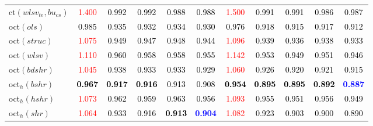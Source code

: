 \begin{tabular}[t]{l|>{}cccc>{}c|ccccc}
ct$(wlsv_{te}, bu_{cs})$ & \textcolor{red}{1.400} & \textcolor{black}{0.992} & \textcolor{black}{0.992} & \textcolor{black}{0.988} & \textcolor{black}{0.988} & \textcolor{red}{1.500} & \textcolor{black}{0.991} & \textcolor{black}{0.991} & \textcolor{black}{0.986} & \textcolor{black}{0.987}\\
oct$(ols)$ & \textcolor{black}{0.985} & \textcolor{black}{0.935} & \textcolor{black}{0.932} & \textcolor{black}{0.934} & \textcolor{black}{0.930} & \textcolor{black}{0.976} & \textcolor{black}{0.918} & \textcolor{black}{0.915} & \textcolor{black}{0.917} & \textcolor{black}{0.912}\\
oct$(struc)$ & \textcolor{red}{1.075} & \textcolor{black}{0.949} & \textcolor{black}{0.947} & \textcolor{black}{0.948} & \textcolor{black}{0.944} & \textcolor{red}{1.096} & \textcolor{black}{0.939} & \textcolor{black}{0.936} & \textcolor{black}{0.938} & \textcolor{black}{0.933}\\
oct$(wlsv)$ & \textcolor{red}{1.110} & \textcolor{black}{0.960} & \textcolor{black}{0.958} & \textcolor{black}{0.958} & \textcolor{black}{0.955} & \textcolor{red}{1.142} & \textcolor{black}{0.953} & \textcolor{black}{0.949} & \textcolor{black}{0.951} & \textcolor{black}{0.946}\\
oct$(bdshr)$ & \textcolor{red}{1.045} & \textcolor{black}{0.938} & \textcolor{black}{0.933} & \textcolor{black}{0.933} & \textcolor{black}{0.929} & \textcolor{red}{1.060} & \textcolor{black}{0.926} & \textcolor{black}{0.920} & \textcolor{black}{0.921} & \textcolor{black}{0.915}\\
oct$_h(bshr)$ & \textcolor{black}{\textbf{0.967}} & \textcolor{black}{\textbf{0.917}} & \textcolor{black}{\textbf{0.916}} & \textcolor{black}{0.913} & \textcolor{black}{0.908} & \textcolor{black}{\textbf{0.954}} & \textcolor{black}{\textbf{0.895}} & \textcolor{black}{\textbf{0.895}} & \textcolor{black}{\textbf{0.892}} & \textcolor{blue}{\textbf{0.887}}\\
oct$_h(hshr)$ & \textcolor{red}{1.073} & \textcolor{black}{0.962} & \textcolor{black}{0.959} & \textcolor{black}{0.963} & \textcolor{black}{0.956} & \textcolor{red}{1.093} & \textcolor{black}{0.955} & \textcolor{black}{0.951} & \textcolor{black}{0.956} & \textcolor{black}{0.949}\\
oct$_h(shr)$ & \textcolor{red}{1.064} & \textcolor{black}{0.933} & \textcolor{black}{0.916} & \textcolor{black}{\textbf{0.913}} & \textcolor{blue}{\textbf{0.904}} & \textcolor{red}{1.082} & \textcolor{black}{0.923} & \textcolor{black}{0.903} & \textcolor{black}{0.900} & \textcolor{black}{0.890}\\

\end{tabular}
